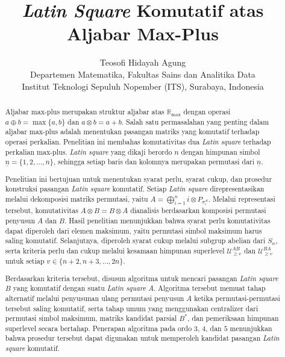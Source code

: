 \documentclass[journal]{IEEEtran}
\theoremstyle{definition}
\theoremstyle{plain}
\begin{document}
\title{\textit{Latin Square} Komutatif atas Aljabar Max-Plus\\ \vspace{12pt}}

\author{Teosofi Hidayah Agung\\
    Departemen Matematika, Fakultas Sains dan Analitika Data\\
    Institut Teknologi Sepuluh Nopember (ITS), Surabaya, Indonesia\\ \vspace{-1em}}


\maketitle

\begin{abstract}
    \small \noindent Aljabar max-plus merupakan struktur aljabar atas $\mathbb{R}_{\max}$ dengan operasi $a\oplus b=\max\{a,b\}$ dan $a\otimes b=a+b$. Salah satu permasalahan yang penting dalam aljabar max-plus adalah menentukan pasangan matriks yang komutatif terhadap operasi perkalian. Penelitian ini membahas komutativitas dua \textit{Latin square} terhadap perkalian max-plus. \textit{Latin square} yang dikaji berordo $n$ dengan himpunan simbol $\underline{n}=\{1,2,\ldots,n\}$, sehingga setiap baris dan kolomnya merupakan permutasi dari $\underline{n}$.

    Penelitian ini bertujuan untuk menentukan syarat perlu, syarat cukup, dan prosedur konstruksi pasangan \textit{Latin square} komutatif. Setiap \textit{Latin square} direpresentasikan melalui dekomposisi matriks permutasi, yaitu $A=\bigoplus_{i=1}^{n} i\otimes P_{\sigma_i^A}$. Melalui representasi tersebut, komutativitas $A\otimes B=B\otimes A$ dianalisis berdasarkan komposisi permutasi penyusun $A$ dan $B$. Hasil penelitian menunjukkan bahwa syarat perlu komutativitas dapat diperoleh dari elemen maksimum, yaitu permutasi simbol maksimum harus saling komutatif. Selanjutnya, diperoleh syarat cukup melalui subgrup abelian dari $S_n$, serta kriteria perlu dan cukup melalui kesamaan himpunan superlevel $\mathcal{U}_{\ge v}^{AB}$ dan $\mathcal{U}_{\ge v}^{BA}$ untuk setiap $v\in\{n+2,n+3,\ldots,2n\}$.

    Berdasarkan kriteria tersebut, disusun algoritma untuk mencari pasangan \textit{Latin square} $B$ yang komutatif dengan suatu \textit{Latin square} $A$. Algoritma tersebut memuat tahap alternatif melalui penyusunan ulang permutasi penyusun $A$ ketika permutasi-permutasi tersebut saling komutatif, serta tahap umum yang menggunakan centralizer dari permutasi simbol maksimum, matriks kandidat parsial $B^*$, dan pemeriksaan himpunan superlevel secara bertahap. Penerapan algoritma pada ordo $3$, $4$, dan $5$ menunjukkan bahwa prosedur tersebut dapat digunakan untuk memperoleh kandidat pasangan \textit{Latin square} komutatif.
\end{abstract}
\end{document}
